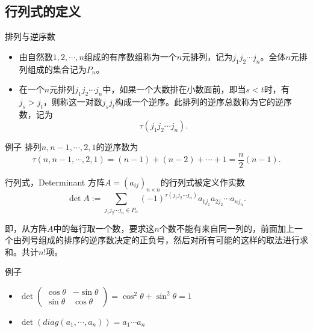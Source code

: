 \subsection{行列式的定义}


\begin{frame}

\begin{block}{排列与逆序数}
\begin{itemize}
\item 由自然数$1,2,\cdots,n$组成的有序数组称为一个$n$元排列，记为$j_1j_2\cdots j_n$。全体$n$元排列组成的集合记为$P_n$。
\item 在一个$n$元排列$j_1j_2\cdots j_n$中，如果一个大数排在小数面前，即当$s<t$时，有$j_s>j_t$，则称这一对数$j_sj_t$构成一个逆序。此排列的逆序总数称为它的逆序数，记为\[\tau(j_1j_2\cdots j_n).\]
\end{itemize}

\end{block}

\begin{block}{例子}
排列$n, n-1, \cdots, 2, 1$的逆序数为
\[\tau(n, n-1, \cdots, 2, 1) = (n-1)+(n-2)+\cdots+1 = \frac{n}{2}(n-1).\]
\end{block}

\end{frame}


\begin{frame}

\begin{block}{行列式，Determinant}
方阵$A = (a_{ij})_{n\times n}$的行列式被定义作实数
\[\det A := \sum\limits_{j_1j_2\cdots j_n \in P_n} (-1)^{\tau(j_1j_2\cdots j_n)} a_{1j_1}a_{2j_2}\cdots a_{nj_n}.\]
\end{block}

\pause

即，从方阵$A$中的每行取一个数，要求这$n$个数不能有来自同一列的，前面加上一个由列号组成的排序的逆序数决定的正负号，然后对所有可能的这样的取法进行求和。共计$n!$项。

\pause

\begin{block}{例子}
\begin{itemize}
\item \(\displaystyle \det \begin{pmatrix} \cos\theta & -\sin\theta \\ \sin\theta & \cos\theta \end{pmatrix} = \cos^2\theta + \sin^2\theta = 1\)
\item $\det(diag(a_1, \cdots, a_n)) = a_1\cdots a_n$
\end{itemize}
\end{block}

\end{frame}


